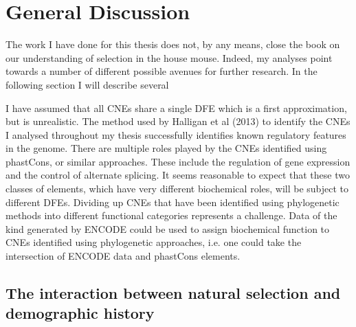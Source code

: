 \chapter{General Discussion}

The work I have done for this thesis does not, by any means, close the book on our understanding of selection in the house mouse. Indeed, my analyses point towards a number of different possible avenues for further research. In the following section I will describe several 

I have assumed that all CNEs share a single DFE which is a first approximation, but is unrealistic. The method used by Halligan et al (2013) to identify the CNEs I analysed throughout my thesis successfully identifies known regulatory features in the genome. There are multiple roles played by the CNEs identified using phastCons, or similar approaches. These include the regulation of gene expression and the control of alternate splicing. It seems reasonable to expect that these two classes of elements, which have very different biochemical roles, will be subject to different DFEs. Dividing up CNEs that have been identified using phylogenetic methods into different functional categories represents a challenge. Data of the kind generated by ENCODE could be used to assign biochemical function to CNEs identified using phylogenetic approaches, i.e. one could take the intersection of ENCODE data and phastCons elements.

\section{The interaction between natural selection and demographic history}

